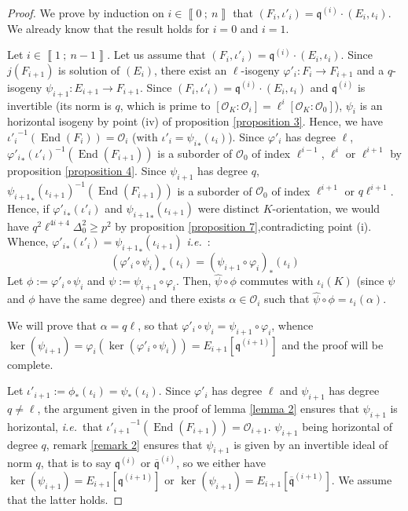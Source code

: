 \documentclass[a4paper,10pt]{report}
\theoremstyle{definition}
\theoremstyle{plain}
\theoremstyle{definition}
\newcommand{\ie}{\emph{i.e.}\ }
\newcommand{\mO}{\mathcal{O}}
\renewcommand{\i}[2]{\left\llbracket #1~;~#2\right\rrbracket}
\renewcommand{\(}{\left(}
\renewcommand{\)}{\right)}
\newcommand{\mf}[1]{\mathfrak{#1}}
\newcommand{\mfq}{\mathfrak{q}}
\DeclareMathOperator{\End}{End}
\begin{document}
\begin{proof}
We prove by induction on $i\in\i{0}{n}$ that $(F_i,\iota'_i)=\mf{q}^{(i)}\cdot(E_{i},\iota_i)$. We already know that the result holds for $i=0$ and $i=1$. 

Let $i\in\i{1}{n-1}$.  Let us assume that $(F_i,\iota'_i)=\mf{q}^{(i)}\cdot(E_{i},\iota_i)$. Since $j(F_{i+1})$ is solution of $(E_i)$,  there exist an $\ell$-isogeny $\varphi'_i: F_i\longrightarrow F_{i+1}$ and a $q$-isogeny $\psi_{i+1}: E_{i+1}\longrightarrow F_{i+1}$. Since $(F_i,\iota'_i)=\mf{q}^{(i)}\cdot(E_{i},\iota_i)$ and $\mfq^{(i)}$ is invertible (its norm is $q$, which is prime to $[\mO_K:\mO_i]=\ell^i[\mO_K:\mO_0]$), $\psi_i$ is an horizontal isogeny by point (iv) of proposition \ref{proposition 3}. Hence, we have ${\iota'_i}^{-1}(\End(F_i))=\mO_i$ (with $\iota'_i={\psi_{i}}_*(\iota_i)$). Since $\varphi'_i$ has degree $\ell$,  ${\varphi'_i}_*(\iota'_i)^{-1}(\End(F_{i+1}))$ is a suborder of $\mO_0$ of index $\ell^{i-1}$, $\ell^i$ or $\ell^{i+1}$ by proposition \ref{proposition 4}. Since $\psi_{i+1}$ has degree $q$, ${\psi_{i+1}}_*(\iota_{i+1})^{-1}(\End(F_{i+1}))$ is a suborder of $\mO_0$ of index $\ell^{i+1}$ or $q\ell^{i+1}$. Hence, if ${\varphi'_i}_*(\iota'_i)$ and ${\psi_{i+1}}_*(\iota_{i+1})$ were distinct $K$-orientation, we would have $q^2\ell^{4i+4}\Delta_0^2\geq p^2$ by proposition \ref{proposition 7},contradicting point (i). Whence, ${\varphi'_i}_*(\iota'_i)={\psi_{i+1}}_*(\iota_{i+1})$ \ie :
\[(\varphi'_i\circ\psi_i)_*(\iota_i)=(\psi_{i+1}\circ\varphi_i)_*(\iota_i)\]
Let $\phi:=\varphi'_i\circ\psi_i$ and $\psi:=\psi_{i+1}\circ\varphi_i$. Then, $\widehat{\psi}\circ\phi$ commutes with $\iota_i(K)$ (since $\psi$ and $\phi$ have the same degree) and there exists $\alpha\in\mO_i$ such that $\widehat{\psi}\circ\phi=\iota_i(\alpha)$. 

We will prove that $\alpha=q\ell$, so that $\varphi'_i\circ\psi_i=\psi_{i+1}\circ\varphi_i$, whence $\ker(\psi_{i+1})=\varphi_i(\ker(\varphi'_i\circ\psi_i))=E_{i+1}[\mfq^{(i+1)}]$ and the proof will be complete.

Let $\iota'_{i+1}:=\phi_*(\iota_i)=\psi_*(\iota_i)$.  Since $\varphi'_i$ has degree $\ell$ and $\psi_{i+1}$ has degree $q\neq \ell$, the argument given in the proof of lemma \ref{lemma 2} ensures that $\psi_{i+1}$ is horizontal, \ie that ${\iota'_{i+1}}^{-1}(\End(F_{i+1}))=\mO_{i+1}$.  $\psi_{i+1}$ being horizontal of degree $q$, remark \ref{remark 2} ensures that $\psi_{i+1}$ is given by an invertible ideal of norm $q$, that is to say $\mfq^{(i)}$ or $\overline{\mfq}^{(i)}$, so we either have $\ker(\psi_{i+1})=E_{i+1}[\mfq^{(i+1)}]$ or $\ker(\psi_{i+1})=E_{i+1}[\overline{\mfq}^{(i+1)}]$.  We assume that the latter holds.


\end{proof}
\end{document}
